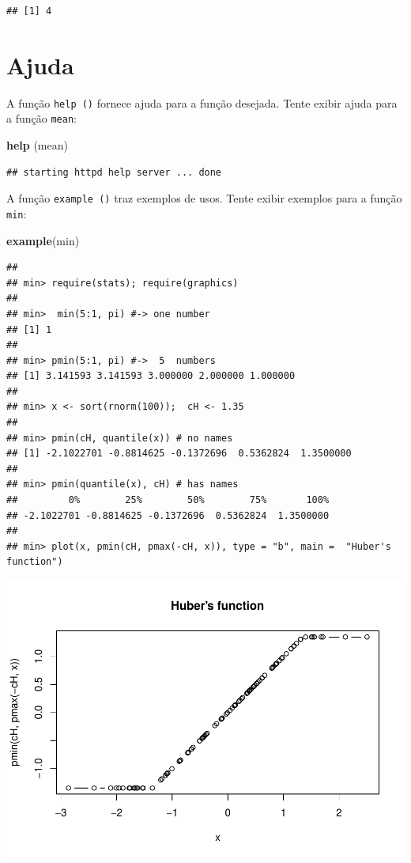 \documentclass[
]{book}
\newenvironment{Shaded}{\begin{snugshade}}{\end{snugshade}}
\newcommand{\KeywordTok}[1]{\textcolor[rgb]{0.13,0.29,0.53}{\textbf{#1}}}
\newcommand{\NormalTok}[1]{#1}
\begin{document}
\begin{verbatim}
## [1] 4
\end{verbatim}

\hypertarget{ajuda}{%
\section{Ajuda}\label{ajuda}}

A função \texttt{help\ ()} fornece ajuda para a função desejada. Tente exibir ajuda para a função \texttt{mean}:

\begin{Shaded}
\begin{Highlighting}[]
\KeywordTok{help}\NormalTok{ (mean)}
\end{Highlighting}
\end{Shaded}

\begin{verbatim}
## starting httpd help server ... done
\end{verbatim}

A função \texttt{example\ ()} traz exemplos de usos. Tente exibir exemplos para a função \texttt{min}:

\begin{Shaded}
\begin{Highlighting}[]
\KeywordTok{example}\NormalTok{(min)}
\end{Highlighting}
\end{Shaded}

\begin{verbatim}
## 
## min> require(stats); require(graphics)
## 
## min>  min(5:1, pi) #-> one number
## [1] 1
## 
## min> pmin(5:1, pi) #->  5  numbers
## [1] 3.141593 3.141593 3.000000 2.000000 1.000000
## 
## min> x <- sort(rnorm(100));  cH <- 1.35
## 
## min> pmin(cH, quantile(x)) # no names
## [1] -2.1022701 -0.8814625 -0.1372696  0.5362824  1.3500000
## 
## min> pmin(quantile(x), cH) # has names
##         0%        25%        50%        75%       100% 
## -2.1022701 -0.8814625 -0.1372696  0.5362824  1.3500000 
## 
## min> plot(x, pmin(cH, pmax(-cH, x)), type = "b", main =  "Huber's function")
\end{verbatim}

\includegraphics{TudodoR_files/figure-latex/unnamed-chunk-14-1.pdf}
\end{document}
